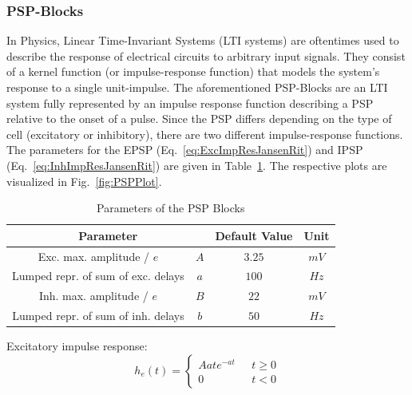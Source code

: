 \subsubsection{PSP-Blocks}
In Physics, Linear Time-Invariant Systems (LTI systems) are oftentimes used to describe the response of
electrical circuits to arbitrary input signals.
They consist of a kernel function (or impulse-response function)
that models the system's response to a single unit-impulse.
The aforementioned PSP-Blocks are an LTI system fully represented by an impulse response function describing a PSP
relative to the onset of a pulse.
Since the PSP differs depending on the type of cell (excitatory or inhibitory),
there are two different impulse-response functions.
The parameters for the EPSP (Eq.~\ref{eq:ExcImpResJansenRit}) and IPSP (Eq.~\ref{eq:InhImpResJansenRit})
are given in Table~\ref{tab:psp_params}.
The respective plots are visualized in Fig.~\ref{fig:PSPPlot}.
\begin{table}[H]
    \centering
    \begin{tabular}{ |c|c|c|c| }
        \hline
        \multicolumn{2}{|c|}{Parameter} & Default Value & Unit \\
        \hline
        \hline
        Exc. max. amplitude / $e$          & \(A\) & \(3.25\) & \(mV\) \\
        \hline
        Lumped repr. of sum of exc. delays & \(a\) & \(100\)  & \(Hz\) \\
        \hline
        Inh. max. amplitude / $e$          & \(B\) & \(22\)   & \(mV\) \\
        \hline
        Lumped repr. of sum of inh. delays & \(b\) & \(50\)   & \(Hz\) \\
        \hline
    \end{tabular}
    \caption{Parameters of the PSP Blocks}
    \label{tab:psp_params}
\end{table}

Excitatory impulse response:
\begin{equation}
    h_e(t) = \begin{cases}
                 Aate^{-at} & \mbox{ } t \geq 0 \\
                 0 & \mbox{ } t < 0
    \end{cases} \label{eq:ExcImpResJansenRit}
\end{equation}

